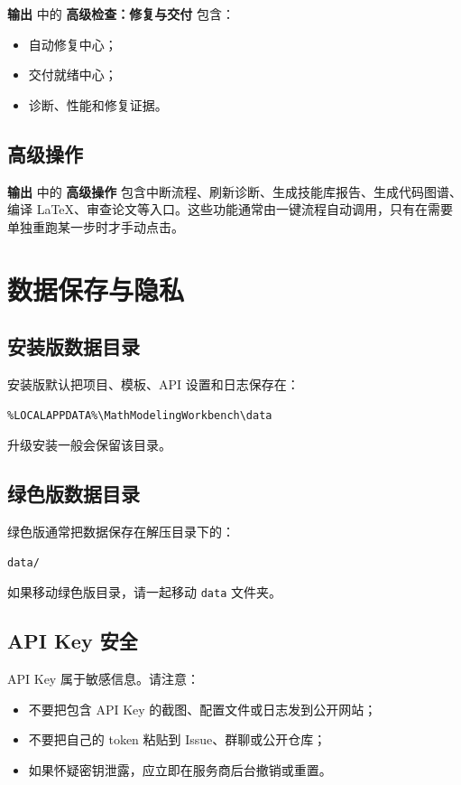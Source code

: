 \documentclass[UTF8,a4paper,12pt]{ctexart}
\newcommand{\menu}[1]{\textbf{#1}}
\begin{document}
\menu{输出} 中的 \menu{高级检查：修复与交付} 包含：

\begin{itemize}
  \item 自动修复中心；
  \item 交付就绪中心；
  \item 诊断、性能和修复证据。
\end{itemize}

\subsection{高级操作}

\menu{输出} 中的 \menu{高级操作} 包含中断流程、刷新诊断、生成技能库报告、生成代码图谱、编译 LaTeX、审查论文等入口。这些功能通常由一键流程自动调用，只有在需要单独重跑某一步时才手动点击。

\section{数据保存与隐私}

\subsection{安装版数据目录}

安装版默认把项目、模板、API 设置和日志保存在：

\begin{verbatim}
%LOCALAPPDATA%\MathModelingWorkbench\data
\end{verbatim}

升级安装一般会保留该目录。

\subsection{绿色版数据目录}

绿色版通常把数据保存在解压目录下的：

\begin{verbatim}
data/
\end{verbatim}

如果移动绿色版目录，请一起移动 \texttt{data} 文件夹。

\subsection{API Key 安全}

API Key 属于敏感信息。请注意：

\begin{itemize}
  \item 不要把包含 API Key 的截图、配置文件或日志发到公开网站；
  \item 不要把自己的 token 粘贴到 Issue、群聊或公开仓库；
  \item 如果怀疑密钥泄露，应立即在服务商后台撤销或重置。
\end{itemize}
\end{document}

